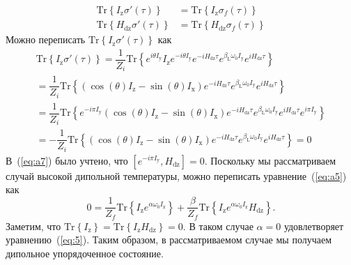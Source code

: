 \documentclass[utf8]{jetp}
\newcommand{\tr}[1]{\mathrm{Tr} \left\{ #1 \right\}}
\newcommand{\sx}{I_\mathrm{x}}
\newcommand{\sy}{I_\mathrm{y}}
\newcommand{\sz}{I_\mathrm{z}}
\newcommand{\hdz}{H_\mathrm{dz}}
\begin{document}
\begin{align}
  \label{eq:a5}
  \mathrm{Tr} \left\{ I_\mathrm{z} \sigma'(\tau) \right\}
  & = \mathrm{Tr} \left\{ I_\mathrm{z} \sigma_{f}(\tau) \right\}
  \\
  \label{eq:a6}
  \mathrm{Tr} \left\{ H_\mathrm{dz} \sigma'(\tau) \right\}
  & = \mathrm{Tr} \left\{ H_\mathrm{dz} \sigma_{f}(\tau) \right\}
\end{align}
%
Можно переписать $\mathrm{Tr} \left\{ I_\mathrm{z} \sigma'(\tau) \right\}$ как
%
\begin{multline}
  \label{eq:a7}
  \tr{I_\mathrm{z} \sigma'(\tau)}
  = \dfrac{1}{Z_{i}} \tr{
    e^{i \theta \sy} \sz e^{-i \theta \sy}
    e^{-i \hdz \tau} e^{\beta_\mathrm{L} \omega_{0} \sy} e^{i \hdz \tau}
  }
  \\
  = \dfrac{1}{Z_i} \tr{
    \left( \cos(\theta) \sz - \sin(\theta) \sx \right)
    e^{-i \hdz \tau} e^{\beta_\mathrm{L} \omega_{0} \sy} e^{i \hdz \tau}
  }
  \\
  = \dfrac{1}{Z_i} \tr{
    e^{-i \pi \sy}
    \left( \cos(\theta) \sz - \sin(\theta) \sx \right)
    e^{-i \hdz \tau} e^{\beta_\mathrm{L} \omega_{0} \sy} e^{i \hdz \tau}
    e^{i \pi \sy}
  }
  \\
  = - \dfrac{1}{Z_i} \tr{
    \left( \cos(\theta) \sz - \sin(\theta) \sx \right)
    e^{-i \hdz \tau} e^{\beta_\mathrm{L} \omega_{0} \sy} e^{i \hdz \tau}
  } = 0
\end{multline}
%
В~(\ref{eq:a7}) было учтено, что $\left[ e^{-i \pi \sy}, \hdz \right] = 0$.
Поскольку мы рассматриваем случай высокой дипольной температуры, можно переписать уравнение~(\ref{eq:a5}) как
\begin{equation}
  \label{eq:a8}
  0 = \dfrac{1}{Z_f} \tr{ \sz e^{\alpha \omega_{0} \sz}}
  + \dfrac{\beta}{Z_f} \tr{\sz e^{\alpha \omega_{0} \sz} \hdz}.
\end{equation}
%
Заметим, что $\tr{\sz} = \tr{\sz\hdz} = 0$.
В таком случае $\alpha = 0$ удовлетворяет уравнению~(\ref{eq:5}).
Таким образом, в рассматриваемом случае мы получаем дипольное упорядоченное состояние.

%
%
\end{document}
